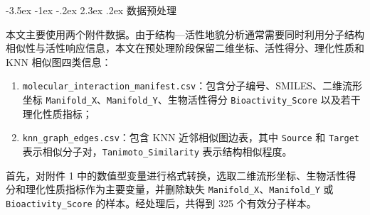 \documentclass[withoutpreface,bwprint]{cumcmthesis}
\makeatletter
\renewcommand\section{\@startsection{section}{1}{\z@}%
  {-3.5ex \@plus -1ex \@minus -.2ex}%
  {2.3ex \@plus.2ex}%
  {\centering\normalfont\zihao{4}\heiti}}
\makeatother
\begin{document}
\begin{table}[H]
\centering
\caption{主要符号说明}
\small
{}
\end{table}


\section{数据预处理}

本文主要使用两个附件数据。由于结构—活性地貌分析通常需要同时利用分子结构相似性与活性响应信息\cite{ref:guha2012landscape}，本文在预处理阶段保留二维坐标、活性得分、理化性质和 KNN 相似图四类信息：

\begin{enumerate}
\item \texttt{molecular\_interaction\_manifest.csv}：包含分子编号、SMILES、二维流形坐标 \texttt{Manifold\_X}、\texttt{Manifold\_Y}、生物活性得分 \texttt{Bioactivity\_Score} 以及若干理化性质指标；
\item \texttt{knn\_graph\_edges.csv}：包含 KNN 近邻相似图边表，其中 \texttt{Source} 和 \texttt{Target} 表示相似分子对，\texttt{Tanimoto\_Similarity} 表示结构相似程度。

\end{enumerate}
首先，对附件 1 中的数值型变量进行格式转换，选取二维流形坐标、生物活性得分和理化性质指标作为主要变量，并删除缺失 \texttt{Manifold\_X}、\texttt{Manifold\_Y} 或 \texttt{Bioactivity\_Score} 的样本。经处理后，共得到 325 个有效分子样本。
\end{document}
